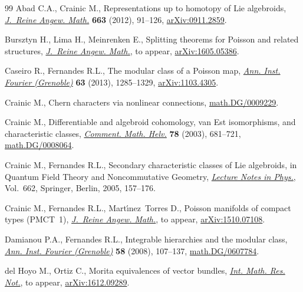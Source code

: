 \documentclass[11pt]{article}
\numberwithin{equation}{section}
\newcommand{\8}{\infty}
\begin{document}
\begin{thebibliography}{99}
Abad C.A., Crainic M., Representations up to homotopy of {L}ie algebroids,
 \href{https://doi.org/10.1515/CRELLE.2011.095}{\textit{J.~Reine Angew. Math.}} \textbf{663} (2012), 91--126,
 \href{https://arxiv.org/abs/0911.2859}{arXiv:0911.2859}.

Bursztyn H., Lima H., Meinrenken E., Splitting theorems for {P}oisson and
 related structures, \href{https://doi.org/10.1515/crelle-2017-001}{\textit{J.~Reine Angew. Math.}}, {t}o appear,
 \href{https://arxiv.org/abs/1605.05386}{arXiv:1605.05386}.

Caseiro R., Fernandes R.L., The modular class of a {P}oisson map, \href{https://doi.org/10.5802/aif.2804}{\textit{Ann.
 Inst. Fourier (Grenoble)}} \textbf{63} (2013), 1285--1329, \href{https://arxiv.org/abs/1103.4305}{arXiv:1103.4305}.

Crainic M., Chern characters via nonlinear connections,
 \href{https://arxiv.org/abs/math.DG/0009229}{math.DG/0009229}.

Crainic M., Differentiable and algebroid cohomology, van {E}st isomorphisms,
 and characteristic classes, \href{https://doi.org/10.1007/s00014-001-0766-9}{\textit{Comment. Math. Helv.}} \textbf{78} (2003),
 681--721, \href{https://arxiv.org/abs/math.DG/0008064}{math.DG/0008064}.

Crainic M., Fernandes R.L., Secondary characteristic classes of {L}ie
 algebroids, in Quantum Field Theory and Noncommutative Geometry,
 \href{https://doi.org/10.1007/11342786_9}{\textit{Lecture Notes in Phys.}}, Vol.~662, Springer, Berlin, 2005, 157--176.

Crainic M., Fernandes R.L., Mart\'{\i}nez~Torres D., Poisson manifolds of
 compact types ({PMCT}~1), \href{https://doi.org/10.1515/crelle-2017-0006}{\textit{J.~Reine Angew. Math.}}, {t}o appear,
 \href{https://arxiv.org/abs/1510.07108}{arXiv:1510.07108}.

Damianou P.A., Fernandes R.L., Integrable hierarchies and the modular class,
 \href{https://doi.org/10.5802/aif.2346}{\textit{Ann. Inst. Fourier (Grenoble)}} \textbf{58} (2008), 107--137,
 \href{https://arxiv.org/abs/math.DG/0607784}{math.DG/0607784}.

del Hoyo M., Ortiz C., Morita equivalences of vector bundles, \href{https://doi.org/10.1093/imrn/rny149}{\textit{Int.
 Math. Res. Not.}}, {t}o appear, \href{https://arxiv.org/abs/1612.09289}{arXiv:1612.09289}.


\end{thebibliography}
\end{document}
